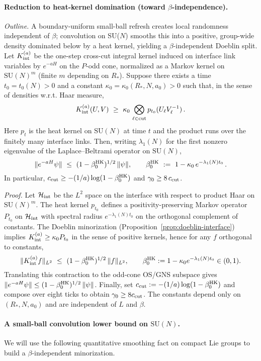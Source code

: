 \documentclass[11pt]{amsart}
\begin{document}
\paragraph{Reduction to heat-kernel domination (toward $\beta$-independence).} \emph{Outline.} A boundary-uniform small-ball refresh creates local randomness independent of $\beta$; convolution on SU($N$) smooths this into a positive, group-wide density dominated below by a heat kernel, yielding a $\beta$-independent Doeblin split.
Let $K_{\rm int}^{(a)}$ be the one-step cross-cut integral kernel induced on interface link variables by $e^{-aH}$ on the $P$-odd cone, normalized as a Markov kernel on $\mathrm{SU}(N)^m$ (finite $m$ depending on $R_*$). Suppose there exists a time $t_0=t_0(N)>0$ and a constant $\kappa_0=\kappa_0(R_*,N,a_0)>0$ such that, in the sense of densities w.r.t. Haar measure,
\[
  K_{\rm int}^{(a)}(U,V)\ \ge\ \kappa_0\,\bigotimes_{\ell\in \text{cut}} p_{t_0}(U_\ell V_\ell^{-1})\,.
\]
Here $p_{t}$ is the heat kernel on $\mathrm{SU}(N)$ at time $t$ and the product runs over the finitely many interface links. Then, writing $\lambda_1(N)$ for the first nonzero eigenvalue of the Laplace--Beltrami operator on $\mathrm{SU}(N)$,
\[
  \|e^{-aH}\psi\|\ \le\ (1-\beta_0^{\rm HK})^{1/2}\,\|\psi\|,\qquad
  \beta_0^{\rm HK}\ :=\ 1-\kappa_0\,e^{-\lambda_1(N) t_0}\,.
\]
In particular, $c_{\rm cut}\ge -(1/a)\log(1-\beta_0^{\rm HK})$ and $\gamma_0\ge 8\,c_{\rm cut}$.

\emph{Proof.} Let $\mathcal H_{\rm int}$ be the $L^2$ space on the interface with respect to product Haar on $\mathrm{SU}(N)^m$. The heat kernel $p_{t_0}$ defines a positivity-preserving Markov operator $P_{t_0}$ on $\mathcal H_{\rm int}$ with spectral radius $e^{-\lambda_1(N) t_0}$ on the orthogonal complement of constants. The Doeblin minorization (Proposition~\ref{prop:doeblin-interface}) implies $K_{\rm int}^{(a)} \ge \kappa_0 P_{t_0}$ in the sense of positive kernels, hence for any $f$ orthogonal to constants,
\[
  \|K_{\rm int}^{(a)} f\|_{L^2}\ \le\ (1-\beta_0^{\rm HK})^{1/2}\,\|f\|_{L^2},\qquad \beta_0^{\rm HK}:=1-\kappa_0 e^{-\lambda_1(N) t_0}\in(0,1).
\]
Translating this contraction to the odd-cone OS/GNS subspace gives $\|e^{-aH}\psi\|\le (1-\beta_0^{\rm HK})^{1/2}\,\|\psi\|$. Finally, set $c_{\rm cut}:=-(1/a)\log(1-\beta_0^{\rm HK})$ and compose over eight ticks to obtain $\gamma_0\ge 8 c_{\rm cut}$. The constants depend only on $(R_*,N,a_0)$ and are independent of $L$ and $\beta$.

\paragraph{A small-ball convolution lower bound on $\mathrm{SU}(N)$.}
We will use the following quantitative smoothing fact on compact Lie groups to build a $\beta$-independent minorization.
\end{document}
